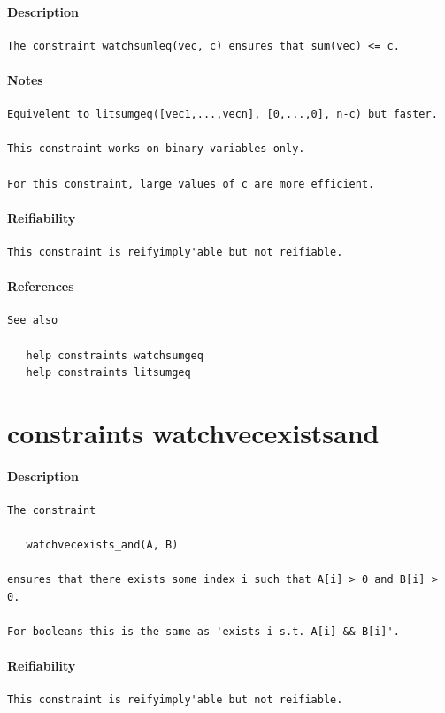 \documentclass[oneside]{book}
\begin{document}
\paragraph{Description}
{\footnotesize
\begin{verbatim}
The constraint watchsumleq(vec, c) ensures that sum(vec) <= c.
\end{verbatim}
}
\paragraph{Notes}
{\footnotesize
\begin{verbatim}
Equivelent to litsumgeq([vec1,...,vecn], [0,...,0], n-c) but faster.

This constraint works on binary variables only.

For this constraint, large values of c are more efficient.
\end{verbatim}
}
\paragraph{Reifiability}
{\footnotesize
\begin{verbatim}
This constraint is reifyimply'able but not reifiable.
\end{verbatim}
}
\paragraph{References}
{\footnotesize
\begin{verbatim}
See also

   help constraints watchsumgeq 
   help constraints litsumgeq
\end{verbatim}
}
\section{constraints watchvecexists\textunderscore and}
\paragraph{Description}
{\footnotesize
\begin{verbatim}
The constraint

   watchvecexists_and(A, B)

ensures that there exists some index i such that A[i] > 0 and B[i] > 0.

For booleans this is the same as 'exists i s.t. A[i] && B[i]'.
\end{verbatim}
}
\paragraph{Reifiability}
{\footnotesize
\begin{verbatim}
This constraint is reifyimply'able but not reifiable.
\end{verbatim}
}
\end{document}
